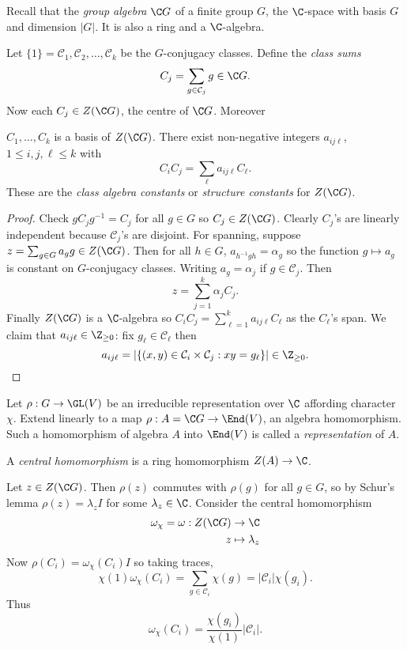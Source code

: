 \documentclass[a4paper]{article}
\newcommand{\ccl}{{\mathcal C}} %
\theoremstyle{definition}
\begin{document}
Recall that the \emph{group algebra} \(\C G\) of a finite group \(G\), the \(\C\)-space with basis \(G\) and dimension \(|G|\). It is also a ring and a \(\C\)-algebra.

Let \(\{1\} = \ccl_1, \ccl_2, \dots, \ccl_k\) be the \(G\)-conjugacy classes. Define the \emph{class sums}
\[
  C_j = \sum_{g \in \mathcal C_j} g \in \C G.
\]
Now each \(C_j \in Z(\C G)\), the centre of \(\C G\). Moreover
\begin{proposition}
  \(C_1, \dots, C_k\) is a basis of \(Z(\C G)\). There exist non-negative integers \(a_{ij\ell}\), \(1 \leq i, j, \ell \leq k\) with
  \[
    C_iC_j = \sum_\ell a_{ij\ell} C_\ell.
  \]
  These are the \emph{class algebra constants} or \emph{structure constants} for \(Z(\C G)\).
\end{proposition}

\begin{proof}
  Check \(g C_j g^{-1} = C_j\) for all \(g \in G\) so \(C_j \in Z(\C G)\). Clearly \(C_j\)'s are linearly independent because \(\ccl_j\)'s are disjoint. For spanning, suppose \(z = \sum_{g \in G} a_g g \in Z(\C G)\). Then for all \(h \in G\), \(a_{h^{-1}gh} = \alpha_g\) so the function \(g \mapsto a_g\) is constant on \(G\)-conjugacy classes. Writing \(a_g = \alpha_j\) if \(g \in \ccl_j\). Then
  \[
    z = \sum_{j = 1}^k \alpha_j C_j.
  \]
  Finally \(Z(\C G)\) is a \(\C\)-algebra so \(C_iC_j = \sum_{\ell = 1}^k a_{ij\ell} C_\ell\) as the \(C_\ell\)'s span. We claim that \(a_{ij\ell} \in \Z_{\geq 0}\): fix \(g_\ell \in \ccl_\ell\) then
    \[
      a_{ij\ell} = |\{(x, y) \in \ccl_i \times \ccl_j: xy = g_\ell\}| \in \Z_{\geq 0}.
    \]
\end{proof}

\begin{definition}
  Let \(\rho: G \to \GL(V)\) be an irreducible representation over \(\C\) affording character \(\chi\). Extend linearly to a map \(\rho: A = \C G \to \End(V)\), an algebra homomorphism. Such a homomorphism of algebra \(A\) into \(\End(V)\) is called a \emph{representation} of \(A\).

  A \emph{central homomorphism} is a ring homomorphism \(Z(A) \to \C\).
\end{definition}

Let \(z \in Z(\C G)\). Then \(\rho(z)\) commutes with \(\rho(g)\) for all \(g \in G\), so by Schur's lemma \(\rho(z) = \lambda_z I\) for some \(\lambda_z \in \C\). Consider the central homomorphism
\begin{align*}
  \omega_\chi = \omega: Z(\C G) &\to \C \\
  z &\mapsto \lambda_z
\end{align*}
Now \(\rho(C_i) = \omega_\chi(C_i) I\) so taking traces,
\[
  \chi(1) \omega_\chi(C_i)
  = \sum_{g \in \ccl_i} \chi(g)
  = |\ccl_i| \chi(g_i).
\]
Thus
\[
  \omega_\chi(C_i) = \frac{\chi(g_i)}{\chi(1)} |\ccl_i|.
\]
\end{document}
